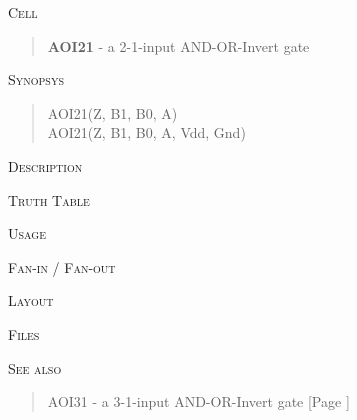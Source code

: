 
\label{AOI21}
\textsc{Cell}
\begin{quote}
    \textbf{AOI21} - a 2-1-input AND-OR-Invert gate
\end{quote}

\textsc{Synopsys}
\begin{quote}
    AOI21(Z, B1, B0, A) \\
    AOI21(Z, B1, B0, A, Vdd, Gnd)
\end{quote}

\textsc{Description}

%

\textsc{Truth Table}


\textsc{Usage}

\textsc{Fan-in / Fan-out}

\textsc{Layout}

\textsc{Files}

\textsc{See also}
\begin{quote}
    AOI31 - a 3-1-input AND-OR-Invert gate [Page \pageref{AOI31}]
\end{quote}
